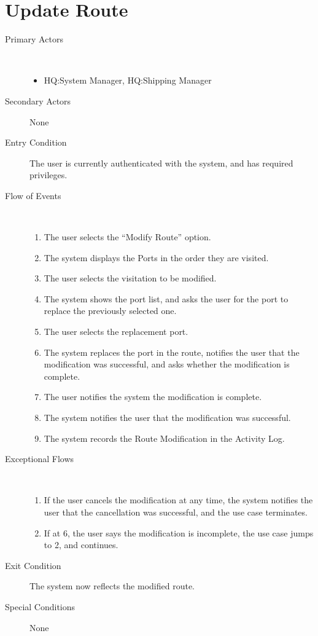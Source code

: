 \documentclass[a4paper,10pt]{report}
\begin{document}
\section{Update Route}
\begin{description}
\item[Primary Actors] \
  \begin{itemize}
  \item HQ:System Manager, HQ:Shipping Manager
  \end{itemize}
\item[Secondary Actors] None
\item[Entry Condition]
  The user is currently authenticated with the system, and has required privileges.
\item[Flow of Events] \
  \begin{enumerate}
  \item The user selects the ``Modify Route'' option.
  \item The system displays the Ports in the order they are visited.
  \item The user selects the visitation to be modified.
  \item The system shows the port list, and asks the user for the port to replace the previously selected one.
  \item The user selects the replacement port.
  \item The system replaces the port in the route, notifies the user that the modification was successful, and asks whether the modification is complete.
  \item The user notifies the system the modification is complete.
  \item The system notifies the user that the modification was successful.
    \item The system records the Route Modification in the Activity Log.
  \end{enumerate}
\item[Exceptional Flows] \
  \begin{enumerate}
  \item If the user cancels the modification at any time, the system notifies the user that the cancellation was successful, and the use case terminates.
  \item If at 6, the user says the modification is incomplete, the use case jumps to 2, and continues.
  \end{enumerate}
\item[Exit Condition]
  The system now reflects the modified route.
\item[Special Conditions] None
\end{description}
\end{document}
